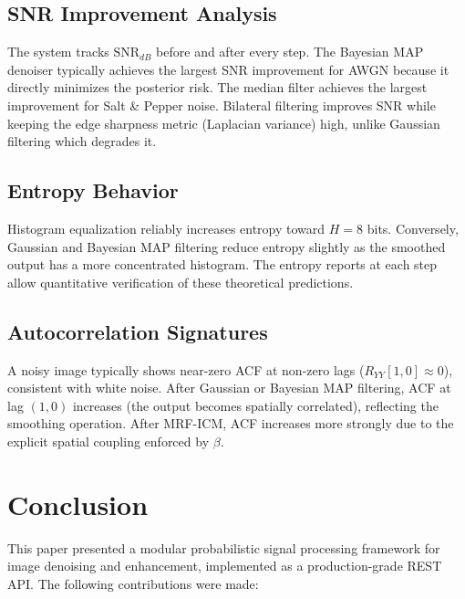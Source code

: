 \documentclass[10pt,conference]{IEEEtran}
\begin{document}
\subsection{SNR Improvement Analysis}
The system tracks $\text{SNR}_{dB}$ before and after every step. The Bayesian MAP denoiser typically achieves the largest SNR improvement for AWGN because it directly minimizes the posterior risk. The median filter achieves the largest improvement for Salt \& Pepper noise. Bilateral filtering improves SNR while keeping the edge sharpness metric (Laplacian variance) high, unlike Gaussian filtering which degrades it.

\subsection{Entropy Behavior}
Histogram equalization reliably increases entropy toward $H=8$ bits. Conversely, Gaussian and Bayesian MAP filtering reduce entropy slightly as the smoothed output has a more concentrated histogram. The entropy reports at each step allow quantitative verification of these theoretical predictions.

\subsection{Autocorrelation Signatures}
A noisy image typically shows near-zero ACF at non-zero lags ($R_{YY}[1,0] \approx 0$), consistent with white noise. After Gaussian or Bayesian MAP filtering, ACF at lag $(1,0)$ increases (the output becomes spatially correlated), reflecting the smoothing operation. After MRF-ICM, ACF increases more strongly due to the explicit spatial coupling enforced by $\beta$.

\section{Conclusion}

This paper presented a modular probabilistic signal processing framework for image denoising and enhancement, implemented as a production-grade REST API. The following contributions were made:
\end{document}
